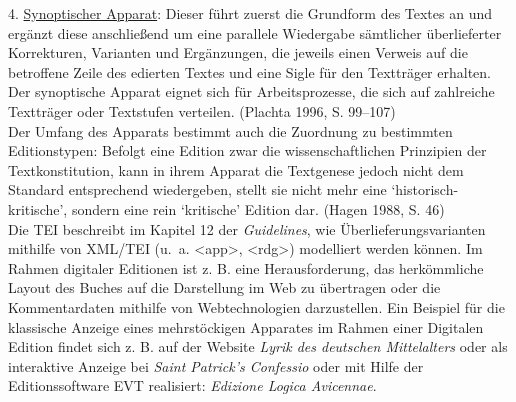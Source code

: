 \documentclass{article}
\begin{document}
        4.	\href{http://gams.uni-graz.at/o:konde.174}{Synoptischer Apparat}: Dieser führt zuerst die Grundform des Textes an und ergänzt diese anschließend um eine parallele Wiedergabe sämtlicher überlieferter Korrekturen, Varianten und Ergänzungen, die jeweils einen Verweis auf die betroffene Zeile des edierten Textes und eine Sigle für den Textträger erhalten. Der synoptische Apparat eignet sich für Arbeitsprozesse, die sich auf zahlreiche Textträger oder Textstufen verteilen. (Plachta 1996, S.  99–107)\\
            
        Der Umfang des Apparats bestimmt auch die Zuordnung zu bestimmten Editionstypen: Befolgt eine Edition zwar die wissenschaftlichen Prinzipien der Textkonstitution, kann in ihrem Apparat die Textgenese jedoch nicht dem Standard entsprechend wiedergeben, stellt sie nicht mehr eine ‘historisch-kritische’, sondern eine rein ‘kritische’ Edition dar. (Hagen 1988, S. 46)\\
            
        Die TEI beschreibt im Kapitel 12 der \emph{Guidelines}, wie Überlieferungsvarianten mithilfe von XML/TEI (u. a. <app>, <rdg>) modelliert werden können.  Im Rahmen digitaler Editionen ist z. B. eine Herausforderung, das herkömmliche Layout des Buches auf die Darstellung im Web zu übertragen oder die Kommentardaten mithilfe von Webtechnologien darzustellen. Ein Beispiel für die klassische Anzeige eines mehrstöckigen Apparates im Rahmen einer Digitalen Edition findet sich z. B. auf der Website \emph{Lyrik des deutschen Mittelalters} oder als interaktive Anzeige bei \emph{Saint Patrick’s Confessio} oder mit Hilfe der Editionssoftware EVT realisiert: \emph{Edizione Logica Avicennae}. \\
            
\end{document}
